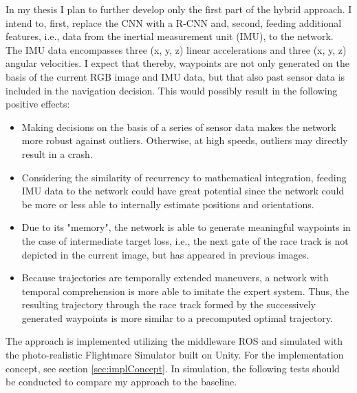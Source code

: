 In my thesis I plan to further develop only the first part of the hybrid approach.
I intend to, first, replace the CNN with a R-CNN and,
second, feeding additional features, i.e., data from the inertial measurement unit (IMU), to the network.
The IMU data encompasses three (x, y, z) linear accelerations and three (x, y, z) angular velocities.
I expect that thereby, 
waypoints are not only generated on the basis of the current RGB image and IMU data, 
but that also past sensor data is included in the navigation decision.
This would possibly result in the following positive effects:
\begin{itemize}
	\item Making decisions on the basis of a series of sensor data makes the network more robust against outliers.
			Otherwise, at high speeds, outliers may directly result in a crash.
	\item Considering the similarity of recurrency to mathematical integration,
			feeding IMU data to the network could have great potential since the network could be more or less able to internally estimate positions and orientations.
	\item Due to its "memory", the network is able to generate meaningful waypoints in the case of intermediate target loss, i.e.,
			the next gate of the race track is not depicted in the current image, but has appeared in previous images.
	\item Because trajectories are temporally extended maneuvers, a network with temporal comprehension is more able to imitate the expert system.
			Thus, the resulting trajectory through the race track formed 
			by the successively generated waypoints 
			is more similar to a precomputed optimal trajectory.
\end{itemize}
The approach is implemented utilizing the middleware ROS \cite{ros}
and simulated with the photo-realistic Flightmare Simulator \cite{song2020flightmare} built on Unity.
For the implementation concept, see section \ref{sec:implConcept}.
In simulation, the following tests should be conducted to compare my approach to the baseline.





